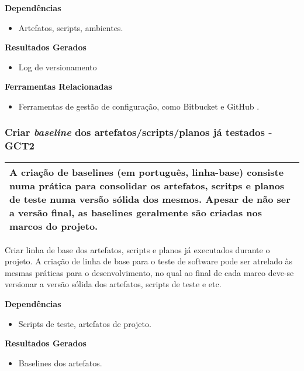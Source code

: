 \textbf{Dependências}
 \begin{itemize}
     \item Artefatos, scripts, ambientes.
\end{itemize}

\textbf{Resultados Gerados}
\begin{itemize}
    \item Log de versionamento
\end{itemize}

\textbf{Ferramentas Relacionadas }
\begin{itemize}
    \item Ferramentas de gestão de configuração, como Bitbucket \cite{Bitbucket} e GitHub \cite{GitHub}.
\end{itemize}

\subsubsection{Criar \textit{baseline} dos artefatos/scripts/planos já testados - GCT2 }
\label{sec:gct2}

\begin{table}[!ht]
\centering
\begin{tabular}{|p{130mm}|}
\hline
A criação de baselines (em português, linha-base) consiste numa prática para consolidar os artefatos, scritps e planos de teste numa versão sólida dos mesmos. Apesar de não ser a versão final, as baselines geralmente são criadas nos marcos do projeto. \\ 
\hline
\end{tabular}
\end{table}

Criar linha de base dos artefatos, scripts e planos já executados durante o projeto. A criação de linha de base para o teste de software pode ser atrelado às mesmas práticas para o desenvolvimento, no qual ao final de cada marco deve-se versionar a versão sólida dos artefatos, scripts de teste e etc.

\textbf{Dependências }
\begin{itemize}
    \item Scripts de teste, artefatos de projeto.
\end{itemize}

\textbf{Resultados Gerados}
 \begin{itemize}
     \item Baselines dos artefatos.
\end{itemize}

